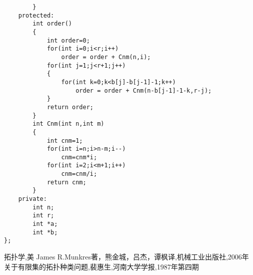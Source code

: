 \documentclass[a4paper,12pt]{article}
\begin{document}
\begin{CJK*}{UTF8}{gbsn}
\begin{lstlisting}
        }
    protected:
        int order()
        {
            int order=0;
            for(int i=0;i<r;i++)
                order = order + Cnm(n,i);
            for(int j=1;j<r+1;j++)
            {
                for(int k=0;k<b[j]-b[j-1]-1;k++)
                    order = order + Cnm(n-b[j-1]-1-k,r-j);
            }
            return order;
        }
        int Cnm(int n,int m)
		{
            int cnm=1;
            for(int i=n;i>n-m;i--)
                cnm=cnm*i;
            for(int i=2;i<m+1;i++)
                cnm=cnm/i;
            return cnm;
        }
    private:
        int n;
        int r;
        int *a;
        int *b;
};
	\end{lstlisting}
	\begin{thebibliography}{99}
		 拓扑学,美 James R.Munkres著，熊金城，吕杰，谭枫译,机械工业出版社,2006年
		 关于有限集的拓扑种类问题,裴惠生,河南大学学报,1987年第四期
	\end{thebibliography}
\end{CJK*}
\end{document}

